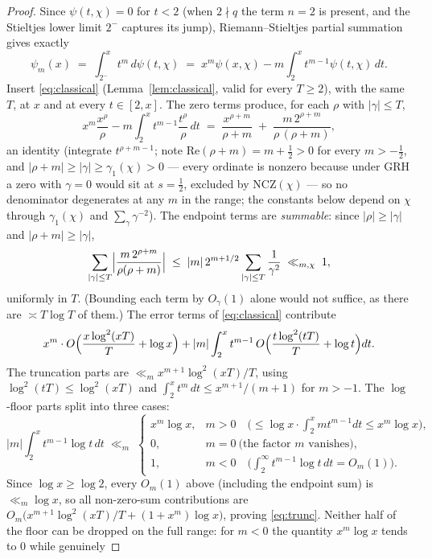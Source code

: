 \documentclass[11pt]{article}
\begin{document}
\begin{proof}
Since $\psi(t,\chi)=0$ for $t<2$ (when $2\nmid q$ the term $n=2$ is
present, and the Stieltjes lower limit $2^-$ captures its jump),
Riemann--Stieltjes partial summation
gives exactly
\[
\psi_m(x)\;=\;\int_{2^-}^{x}t^m\,d\psi(t,\chi)
\;=\;x^m\psi(x,\chi)-m\int_2^x t^{m-1}\psi(t,\chi)\,dt .
\]
Insert \eqref{eq:classical} (Lemma~\ref{lem:classical}, valid for every
$T\ge2$), with the same $T$, at $x$ and at every $t\in[2,x]$. The zero
terms produce, for each $\rho$ with $|\gamma|\le T$,
\[
x^m\frac{x^{\rho}}{\rho}-m\int_2^x t^{m-1}\frac{t^{\rho}}{\rho}\,dt
\;=\;\frac{x^{\rho+m}}{\rho+m}
\;+\;\frac{m\,2^{\rho+m}}{\rho\,(\rho+m)},
\]
an identity (integrate $t^{\rho+m-1}$; note
$\mathrm{Re}(\rho+m)=m+\tfrac12>0$ for every $m>-\tfrac12$, and
$|\rho+m|\ge|\gamma|\ge\gamma_1(\chi)>0$ --- every ordinate is nonzero
because under GRH a zero with $\gamma=0$ would sit at $s=\tfrac12$,
excluded by NCZ$(\chi)$ --- so no denominator degenerates at any
$m$ in the range; the constants below depend on $\chi$ through
$\gamma_1(\chi)$ and $\sum_\gamma\gamma^{-2}$). The endpoint terms are
\emph{summable}: since
$|\rho|\ge|\gamma|$ and $|\rho+m|\ge|\gamma|$,
\[
\sum_{|\gamma|\le T}\Bigl|\frac{m\,2^{\rho+m}}{\rho(\rho+m)}\Bigr|
\;\le\;|m|\,2^{m+1/2}\sum_{|\gamma|\le T}\frac{1}{\gamma^{2}}
\;\ll_{m,\chi}\;1,
\]
uniformly in $T$. (Bounding each term by $O_\gamma(1)$ alone would not
suffice, as there are $\asymp T\log T$ of them.) The error terms of
\eqref{eq:classical} contribute
\[
x^m\cdot O\Bigl(\frac{x\log^2(xT)}{T}+\log x\Bigr)
+|m|\int_2^x t^{m-1}\,O\Bigl(\frac{t\log^2(tT)}{T}+\log t\Bigr)dt .
\]
The truncation parts are
$\ll_m x^{m+1}\log^2(xT)/T$, using $\log^2(tT)\le\log^2(xT)$ and
$\int_2^xt^m\,dt\le x^{m+1}/(m+1)$ for $m>-1$. The $\log$-floor parts
split into three cases:
\[
|m|\int_2^x t^{m-1}\log t\,dt\;\ll_m\;
\begin{cases}
x^m\log x, & m>0
\quad\bigl(\le\log x\cdot\int_2^x mt^{m-1}dt\le x^m\log x\bigr),\\
0, & m=0 \ \text{(the factor $m$ vanishes)},\\
1, & m<0
\quad\bigl(\int_2^\infty t^{m-1}\log t\,dt=O_m(1)\bigr).
\end{cases}
\]
Since $\log x\ge\log2$, every $O_m(1)$ above (including the endpoint
sum) is $\ll_m\log x$, so all non-zero-sum contributions are
$O_m\bigl(x^{m+1}\log^2(xT)/T+(1+x^m)\log x\bigr)$, proving
\eqref{eq:trunc}. Neither half of the floor can be dropped on the full
range: for $m<0$ the quantity $x^m\log x$ tends to $0$ while genuinely

\end{proof}
\end{document}
